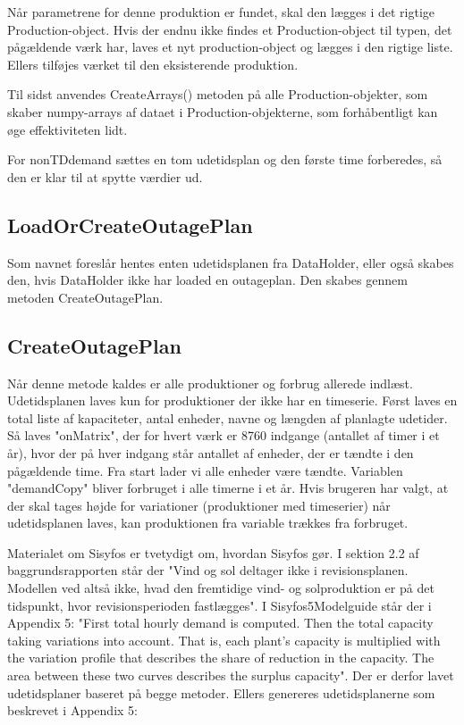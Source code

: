 \documentclass{article}
\begin{document}
Når parametrene for denne produktion er fundet, skal den lægges i det rigtige Production-object. Hvis der endnu ikke findes et Production-object til typen, det pågældende værk har, laves et nyt production-object og lægges i den rigtige liste. Ellers tilføjes værket til den eksisterende produktion.  

Til sidst anvendes CreateArrays() metoden på alle Production-objekter, som skaber numpy-arrays af dataet i Production-objekterne, som forhåbentligt kan øge effektiviteten lidt. 

For nonTDdemand sættes en tom udetidsplan og den første time forberedes, så den er klar til at spytte værdier ud. 

\subsection{LoadOrCreateOutagePlan}
Som navnet foreslår hentes enten udetidsplanen fra DataHolder, eller også skabes den, hvis DataHolder ikke har loaded en outageplan. Den skabes gennem metoden CreateOutagePlan.

\subsection{CreateOutagePlan}
Når denne metode kaldes er alle produktioner og forbrug allerede indlæst. Udetidsplanen laves kun for produktioner der ikke har en timeserie. Først laves en total liste af kapaciteter, antal enheder, navne og længden af planlagte udetider. Så laves "onMatrix", der for hvert værk er 8760 indgange (antallet af timer i et år), hvor der på hver indgang står antallet af enheder, der er tændte i den pågældende time. Fra start lader vi alle enheder være tændte. Variablen "demandCopy" bliver forbruget i alle timerne i et år. Hvis brugeren har valgt, at der skal tages højde for variationer (produktioner med timeserier) når udetidsplanen laves, kan produktionen fra variable trækkes fra forbruget.

Materialet om Sisyfos er tvetydigt om, hvordan Sisyfos gør. I sektion 2.2 af baggrundsrapporten står der "Vind og sol deltager ikke i revisionsplanen. Modellen ved altså ikke, hvad den fremtidige vind- og solproduktion er på det tidspunkt, hvor revisionsperioden fastlægges". I Sisyfos5Modelguide står der i Appendix 5: "First total hourly demand is computed. Then the total capacity taking variations into account. That is, each plant’s capacity is multiplied with the variation profile that describes the share of reduction in the capacity. The area between these two curves describes the surplus capacity". Der er derfor lavet udetidsplaner baseret på begge metoder. Ellers genereres udetidsplanerne som beskrevet i Appendix 5: 
\end{document}
